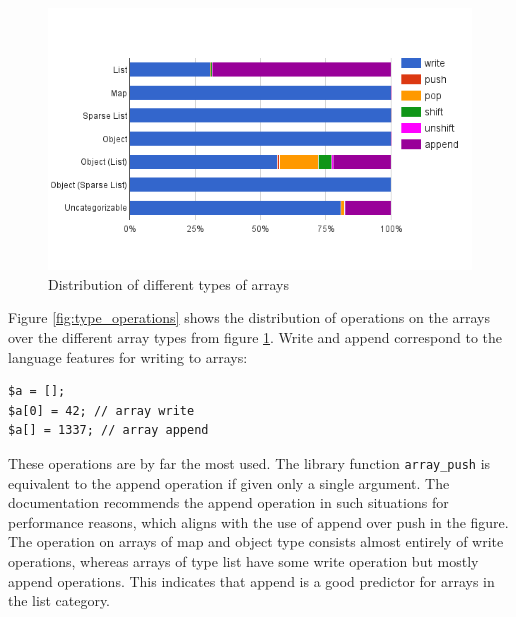 \begin{figure}[htbp]
\centering
\includegraphics[width=\textwidth]{chapters/study/g12.png}
\caption{Distribution of different types of arrays}
\label{fig:array_types}
\end{figure}

Figure \ref{fig:type_operations} shows the distribution of operations on the arrays over the different array types from figure \ref{fig:array_types}. Write and append correspond to the language features for writing to arrays:

\begin{lstlisting}
$a = [];
$a[0] = 42; // array write
$a[] = 1337; // array append
\end{lstlisting}
These operations are by far the most used. The library function \texttt{array\_push} is equivalent to the append operation if given only a single argument. The documentation recommends the append operation in such situations for performance reasons, which aligns with the use of append over push in the figure. The operation on arrays of map and object type consists almost entirely of write operations, whereas arrays of type list have some write operation but mostly append operations. This indicates that append is a good predictor for arrays in the list category. 

